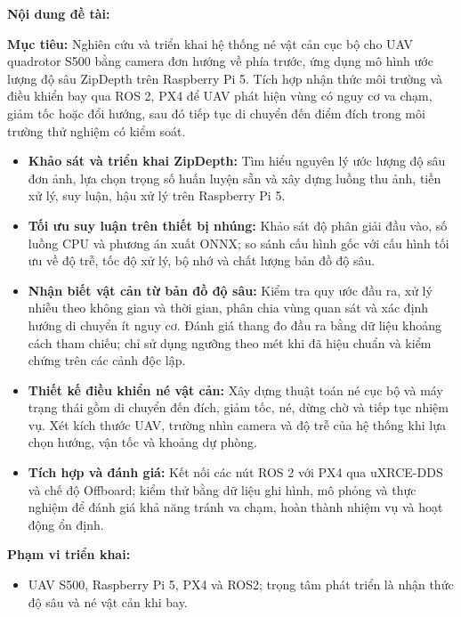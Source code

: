 \begin{mdframed}[style=decuongfield]
\vspace{1mm}
\textbf{Nội dung đề tài:}\par
\textbf{Mục tiêu:} Nghiên cứu và triển khai hệ thống né vật cản cục bộ cho UAV quadrotor S500 bằng camera đơn hướng về phía trước, ứng dụng mô hình ước lượng độ sâu ZipDepth trên Raspberry Pi 5. Tích hợp nhận thức môi trường và điều khiển bay qua ROS 2, PX4 để UAV phát hiện vùng có nguy cơ va chạm, giảm tốc hoặc đổi hướng, sau đó tiếp tục di chuyển đến điểm đích trong môi trường thử nghiệm có kiểm soát.
\begin{itemize}
\item \textbf{Khảo sát và triển khai ZipDepth:} Tìm hiểu nguyên lý ước lượng độ sâu đơn ảnh, lựa chọn trọng số huấn luyện sẵn và xây dựng luồng thu ảnh, tiền xử lý, suy luận, hậu xử lý trên Raspberry Pi 5.
\item \textbf{Tối ưu suy luận trên thiết bị nhúng:} Khảo sát độ phân giải đầu vào, số luồng CPU và phương án xuất ONNX; so sánh cấu hình gốc với cấu hình tối ưu về độ trễ, tốc độ xử lý, bộ nhớ và chất lượng bản đồ độ sâu.
\item \textbf{Nhận biết vật cản từ bản đồ độ sâu:} Kiểm tra quy ước đầu ra, xử lý nhiễu theo không gian và thời gian, phân chia vùng quan sát và xác định hướng di chuyển ít nguy cơ. Đánh giá thang đo đầu ra bằng dữ liệu khoảng cách tham chiếu; chỉ sử dụng ngưỡng theo mét khi đã hiệu chuẩn và kiểm chứng trên các cảnh độc lập.
\item \textbf{Thiết kế điều khiển né vật cản:} Xây dựng thuật toán né cục bộ và máy trạng thái gồm di chuyển đến đích, giảm tốc, né, dừng chờ và tiếp tục nhiệm vụ. Xét kích thước UAV, trường nhìn camera và độ trễ của hệ thống khi lựa chọn hướng, vận tốc và khoảng dự phòng.
\item \textbf{Tích hợp và đánh giá:} Kết nối các nút ROS 2 với PX4 qua uXRCE-DDS và chế độ Offboard; kiểm thử bằng dữ liệu ghi hình, mô phỏng và thực nghiệm để đánh giá khả năng tránh va chạm, hoàn thành nhiệm vụ và hoạt động ổn định.
\end{itemize}
\par\vspace{1mm}
\noindent\makebox[\linewidth][l]{\hspace*{-2.5mm}\rule{\dimexpr\linewidth+5mm\relax}{0.4pt}}\par
\vspace{2mm}
\textbf{Phạm vi triển khai:}
\begin{itemize}
\item UAV S500, Raspberry Pi 5, PX4 và ROS2; trọng tâm phát triển là nhận thức độ sâu và né vật cản khi bay.

\end{itemize}
\end{mdframed}
